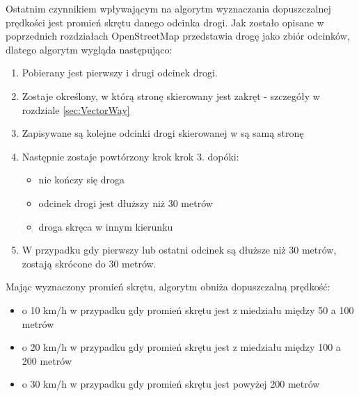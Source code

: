 Ostatnim czynnikiem wpływającym na algorytm wyznaczania dopuszczalnej prędkości jest promień skrętu danego odcinka drogi. Jak zostało opisane w poprzednich rozdziałach OpenStreetMap przedstawia drogę jako zbiór odcinków, dlatego algorytm wygląda następująco:
\begin{enumerate}
\item Pobierany jest pierwszy i drugi odcinek drogi.
\item Zostaje określony, w którą stronę skierowany jest zakręt - szczegóły w rozdziale \ref{sec:VectorWay}
\item Zapisywane są kolejne odcinki drogi skierowanej w są samą stronę
\item Następnie zostaje powtórzony krok krok 3. dopóki:
\begin{itemize}
\item nie kończy się droga
\item odcinek drogi jest dłuższy niż 30 metrów
\item droga skręca w innym kierunku
\end{itemize} 
\item W przypadku gdy pierwszy lub ostatni odcinek są dłuższe niż 30 metrów, zostają skrócone do 30 metrów.
\end{enumerate}

Mając wyznaczony promień skrętu, algorytm obniża dopuszczalną prędkość:
\begin{itemize}
\item o 10 km/h w przypadku gdy promień skrętu jest z miedziału między 50 a 100 metrów
\item o 20 km/h w przypadku gdy promień skrętu jest z miedziału między 100 a 200 metrów
\item o 30 km/h w przypadku gdy promień skrętu jest powyżej 200 metrów
\end{itemize}


